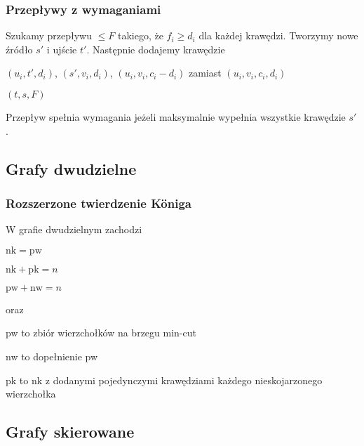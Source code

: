\documentclass[9pt,twoside]{extarticle}
\begin{document}
\begin{multicols*}{3}
    \subsubsection{Przepływy z wymaganiami}
    Szukamy przepływu $\leq F$ takiego, że $f_i \geq d_i$ dla każdej krawędzi.
    Tworzymy nowe źródło $s'$ i ujście $t'$.
    Następnie dodajemy krawędzie
    \begin{compactitem}
      \item $(u_i, t', d_i)$, $(s', v_i, d_i)$, $(u_i, v_i, c_i - d_i)$ zamiast $(u_i, v_i, c_i, d_i)$ 
      \item $(t, s, F)$
    \end{compactitem}
    Przepływ spełnia wymagania jeżeli maksymalnie wypełnia wszystkie krawędzie $s'$.

    \subsection{Grafy dwudzielne}

    \subsubsection{Rozszerzone twierdzenie K\"oniga}
    W grafie dwudzielnym zachodzi
    \begin{compactitem}
      \item $\mathrm{nk} = \mathrm{pw}$
      \item $\mathrm{nk} + \mathrm{pk} = n$
      \item $\mathrm{pw} + \mathrm{nw} = n$
    \end{compactitem}
    oraz
    \begin{compactitem}
      \item pw to zbiór wierzchołków na brzegu min-cut
      \item nw to dopełnienie pw
      \item pk to nk z dodanymi pojedynczymi krawędziami każdego nieskojarzonego wierzchołka
    \end{compactitem}

    \subsection{Grafy skierowane}


\end{multicols*}
\end{document}
